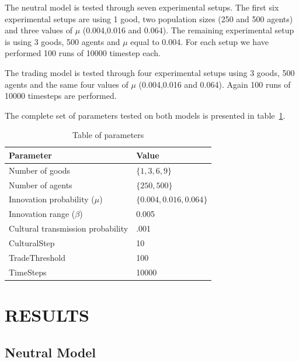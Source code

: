 \documentclass{wscpaperproc}
\begin{document}
The neutral model is tested through seven experimental setups. The first six experimental setups are using 1 good, two population sizes (250 and 500 agents) and three values of $\mu$ (0.004,0.016 and 0.064). The remaining experimental setup is using 3 goods, 500 agents and $\mu$ equal to 0.004. For each setup we have performed 100 runs of 10000 timestep each. 

The trading model is tested through four experimental setups using 3 goods, 500 agents and the same four values of $\mu$ (0.004,0.016 and 0.064). Again 100 runs of 10000 timesteps are performed.

The complete set of parameters tested on both models is presented in table~\ref{tab:parameters}. 


\begin{table}
\begin{center}
\begin{tabular}{@{}ll@{}}
\toprule
Parameter & Value \\
\midrule
Number of goods & $\{1,3,6,9\}$ \\
Number of agents & $\{250,500\}$ \\
Innovation probability ($\mu$) & $\{0.004,0.016,0.064\}$ \\
Innovation range ($\beta$) & 0.005\\
Cultural transmission probability & .001\\
CulturalStep &  10 \\
TradeThreshold & 100  \\
TimeSteps & 10000 \\
\bottomrule
\end{tabular}
\caption{Table of parameters}\label{tab:parameters}
\end{center}
\end{table}






\section{RESULTS}
\subsection{Neutral Model}
\end{document}
